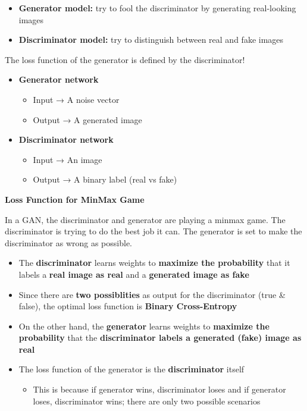 \begin{itemize}
    \item \textbf{Generator model:} try to fool the discriminator by generating real-looking images
    \item \textbf{Discriminator model:} try to distinguish between real and fake images
\end{itemize}

The loss function of the generator is defined by the discriminator!

\begin{itemize}
    \item     \textbf{Generator network}
    \begin{itemize}
        \item Input → A noise vector
        \item Output → A generated image
    \end{itemize}
    \item \textbf{Discriminator network}
    \begin{itemize}
        \item Input → An image
        \item Output → A binary label (real vs fake)\\
    \end{itemize}
\end{itemize}

\noindent \textbf{Loss Function for MinMax Game}
\begin{idea}
    In a GAN, the discriminator and generator are playing a minmax game. The discriminator is trying to do the best job it can. The generator is set to make the discriminator as wrong as possible.
\end{idea}

\begin{itemize}
    \item The \textbf{discriminator} learns weights to\textbf{ maximize the probability} that it labels a \textbf{real image as real} and a \textbf{generated image as fake}
    \item Since there are\textbf{ two possiblities} as output for the discriminator (true \& false), the optimal loss function is \textbf{Binary Cross-Entropy}
\end{itemize}

\begin{itemize}
    \item On the other hand, the \textbf{generator} learns weights to \textbf{maximize the probability} that the \textbf{discriminator labels a generated (fake) image as real}
    \item The loss function of the generator is the\textbf{ discriminator} itself
    \begin{itemize}
        \item This is because if generator wins, discriminator loses and if generator loses, discriminator wins; there are only two possible scenarios
    \end{itemize}

\end{itemize}

